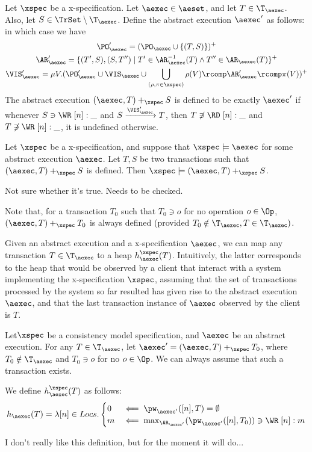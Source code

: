 \documentclass[a4paper,UKenglish]{article}%
\theoremstyle{plain}
\begin{document}
\begin{definition}
Let $\xspec$ be a x-specification. 
Let $\aexec \in \aeset$, and let $T \in \T_{\aexec}$. 
Also, let $S \in \TrSet \setminus \T_{\aexec}$.
Define the abstract execution $\aexec'$ as follows: 
in which case we have
\begin{gather*}
\PO_{\aexec}' = (\PO_{\aexec} \cup \{(T,S)\})^{+}\\
\AR_{\aexec}' = \{(T', S), (S, T'') \mid T' \in \AR_{\aexec}^{-1}(T) \wedge T'' \in \AR_{\aexec}(T)\}^{+}\\
\VIS_{\aexec}' = \mu V.(\PO_{\aexec}' \cup \VIS_{\aexec} \cup \bigcup_{(\rho, \pi \in \xspec)} \rho(V) \rcomp \AR_{\aexec}' \rcomp \pi(V) )^{+}
\end{gather*}
The abstract execution $(\aexec, T) \aeplus_{\xspec} S$ is defined to be exactly $\aexec'$ 
if whenever $S \ni \WR\;[n]:\_$ and $S \xrightarrow{\VIS_{\aexec}'} T$, then $T \not\ni \RD\;[n]:\_$ 
and $T \not\ni \WR\;[n]:\_$, 
it is undefined otherwise.
\end{definition}

\begin{proposition}
Let $\xspec$ be a x-specification, and suppose that $\xspec \models \aexec$ for some abstract
execution $\aexec$. Let $T, S$ be two transactions such that $(\aexec, T) \aeplus_{\xspec} S$ is
defined. Then $\xspec \models (\aexec, T) \aeplus_{\xspec} S$.
\end{proposition}
\ac{Not sure whether it's true. Needs to be checked.}

Note that, for a transaction $T_0$ such that $T_0 \ni o$ for no operation $o \in \Op$, 
$(\aexec, T) \aeplus_{\xspec} T_0$ is always defined (provided $T_0 \notin \T_{\aexec}, T \in \T_{\aexec})$.

Given an abstract execution and a x-specification $\aexec$, we can map any transaction $T \in \T_{\aexec}$ 
to a heap $\heap_{\aexec}^{\xspec}(T)$. Intuitively, the latter corresponds to the heap that would be observed 
by a client that interact with a system implementing the x-specification $\xspec$, assuming that 
the set of transactions processed by the system so far resulted has given rise to the abstract execution 
$\aexec$, and that the last transaction instance of $\aexec$ observed by the client is $T$.

\begin{definition}
Let$\xspec$ be a consistency model specification, and $\aexec$ be an abstract execution. For any $T \in \T_{\aexec}$, 
let $\aexec' = (\aexec, T) \aeplus_{\xspec} T_0$, where $T_0 \notin \T_{\aexec}$ and $T_0 \ni o$ for no 
$o \in \Op$. We can always assume that such a transaction exists. 

We define $\heap_{\aexec}^{\xspec}(T)$ as follows:
\[
\heap_{\aexec}(T) = \lambda [n] \in \locs.
\begin{cases}
0 &\impliedby \pw_{\aexec'}([n], T) = \emptyset\\
m & \impliedby \max_{\AR_{\aexec'}}(\pw_{\aexec'}([n], T_0)) \ni \WR\;[n]: m 
\end{cases}
\]
\end{definition}
\ac{I don't really like this definition, but for the moment it will do...}
\end{document}
